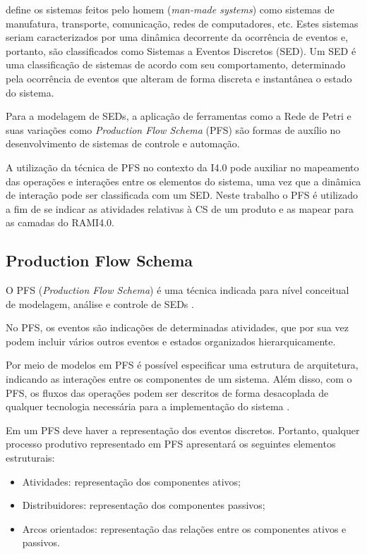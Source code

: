  define os sistemas feitos pelo homem (\textit{man-made systems}) como sistemas de manufatura, transporte, comunicação, redes de computadores, etc. Estes sistemas seriam caracterizados por uma dinâmica decorrente da ocorrência de eventos e, portanto, são classificados como Sistemas a Eventos Discretos (SED). Um SED é uma classificação de sistemas de acordo com seu comportamento, determinado pela ocorrência de eventos que alteram de forma discreta e instantânea o estado do sistema.

Para a modelagem de SEDs, a aplicação de ferramentas como a Rede de Petri e suas variações como \textit{Production Flow Schema} (PFS) são formas de auxílio no desenvolvimento de sistemas de controle e automação.

A utilização da técnica de PFS no contexto da I4.0 pode auxiliar no mapeamento das operações e interações entre os elementos do sistema, uma vez que a dinâmica de interação pode ser classificada com um SED. Neste trabalho o PFS é utilizado a fim de se indicar as atividades relativas à CS de um produto e as mapear para as camadas do RAMI4.0.

\subsection{Production Flow Schema}

O PFS (\textit{Production Flow Schema}) é uma técnica indicada para nível conceitual de modelagem, análise e controle de SEDs \cite{miyagi1996controle}.

No PFS, os eventos são indicações de determinadas atividades, que por sua vez podem incluir vários outros eventos e estados organizados hierarquicamente.

Por meio de modelos em PFS é possível especificar uma estrutura de arquitetura, indicando as interações entre os componentes de um sistema. Além disso, com o PFS, os fluxos das operações podem ser descritos de forma desacoplada de qualquer tecnologia necessária para a implementação do sistema \cite{pisching2018equipmentrami}.

Em um PFS deve haver a representação dos eventos discretos. Portanto, qualquer processo produtivo representado em PFS apresentará os seguintes elementos estruturais:

\begin{itemize}
	\item Atividades: representação dos componentes ativos;
	\item Distribuidores: representação dos componentes passivos;
	\item Arcos orientados: representação das relações entre os componentes ativos  e passivos.
\end{itemize}

